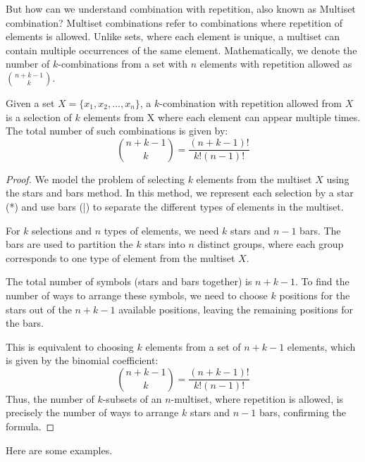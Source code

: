         But how can we understand combination with repetition, also known as Multiset combination?
        Multiset combinations refer to combinations where repetition of elements is allowed. Unlike 
        sets, where each element is unique, a multiset can contain multiple occurrences of the same 
        element. Mathematically, we denote the number of $k$-combinations from a set with $n$ elements 
        with repetition allowed as \( \binom{n + k - 1}{k} \).
        \begin{definition}
            Given a set \( X = \{x_1, x_2, \ldots, x_n\} \), a $k$-combination with repetition allowed from $X$ 
            is a selection of $k$ elements from X where each element can appear multiple times. The total number of such combinations is given by:
            $$ \binom{n + k - 1}{k} = \frac{(n + k - 1)!}{k!(n - 1)!} $$
        \end{definition}
        \begin{proof}
            We model the problem of selecting $k$ elements from the multiset $X$ using the stars and bars method. In this method, we represent each selection by a star (*) and use bars (|) to separate the different types of elements in the multiset.
            
            For $k$ selections and $n$ types of elements, we need $k$ stars and $n-1$ bars. The bars are used to partition the $k$ stars into $n$ distinct groups, where each group corresponds to one type of element from the multiset $X$.
            
            The total number of symbols (stars and bars together) is $n + k - 1$. To find the number of ways to arrange these symbols, we need to choose $k$ positions for the stars out of the $n + k - 1$ available positions, leaving the remaining positions for the bars.
            
            This is equivalent to choosing $k$ elements from a set of $n + k - 1$ elements, which is given by the binomial coefficient:
            \[
            \binom{n+k-1}{k} = \frac{(n+k-1)!}{k!(n-1)!}
            \]
            Thus, the number of $k$-subsets of an $n$-multiset, where repetition is allowed, is precisely the number of ways to arrange $k$ stars and $n-1$ bars, confirming the formula.
        \end{proof}
        Here are some examples.
